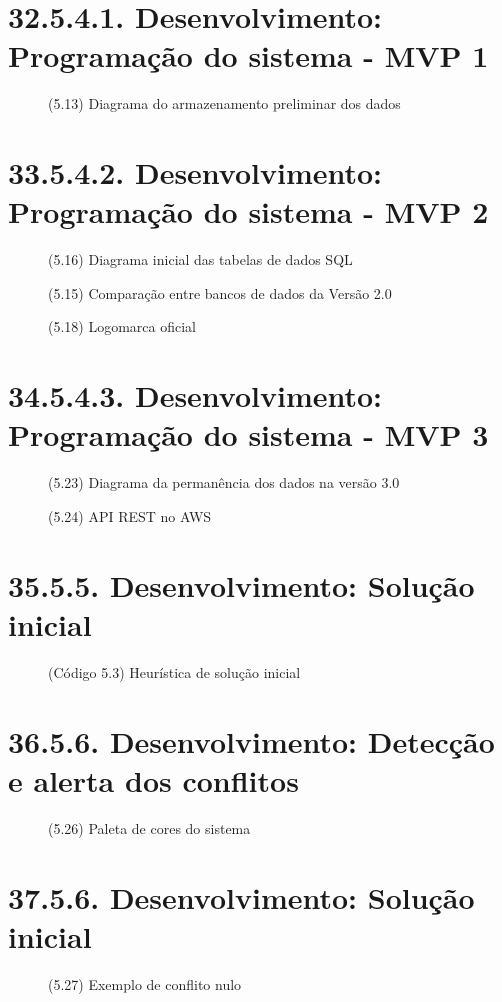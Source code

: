 \chapter*{32.5.4.1. Desenvolvimento: Programação do sistema - MVP 1}
\begin{figure}[htpb]\caption{(5.13) Diagrama do armazenamento preliminar dos dados}\end{figure}
\chapter*{33.5.4.2. Desenvolvimento: Programação do sistema - MVP 2}
\begin{figure}[htpb]\caption{(5.16) Diagrama inicial das tabelas de dados SQL}\end{figure}
\begin{figure}[htpb]\caption{(5.15) Comparação entre bancos de dados da Versão 2.0}\end{figure}
\begin{figure}[htpb]\caption{(5.18) Logomarca oficial}\end{figure}
\chapter*{34.5.4.3. Desenvolvimento: Programação do sistema - MVP 3}
\begin{figure}[htpb]\caption{(5.23) Diagrama da permanência dos dados na versão 3.0}\end{figure}
\begin{figure}[htpb]\caption{(5.24) API REST no AWS}\end{figure}
\chapter*{35.5.5. Desenvolvimento: Solução inicial}
\begin{figure}[htpb]\caption{(Código 5.3) Heurística de solução inicial}\end{figure}
\chapter*{36.5.6. Desenvolvimento: Detecção e alerta dos conflitos}
\begin{figure}[htpb]\caption{(5.26) Paleta de cores do sistema}\end{figure}
\chapter*{37.5.6. Desenvolvimento: Solução inicial}
\begin{figure}[htpb]\caption{(5.27) Exemplo de conflito nulo}\end{figure}
